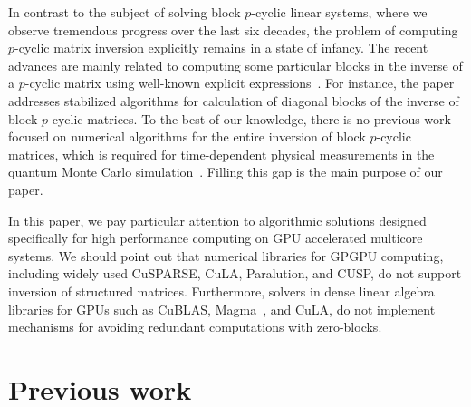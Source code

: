 \documentclass{llncs}
\newcommand{\Blas}{{\sc BLAS}\xspace}
\newcommand{\CuBlas}{{\sc Cu\Blas}\xspace}
\newcommand{\CuSparse}{{\sc CuSPARSE}\xspace}
\newcommand{\Magma}{{\sc Magma}\xspace}
\newcommand{\Cula}{{\sc CuLA}\xspace}
\newcommand{\Paralution}{{\sc Paralution}\xspace}
\newcommand{\Cusp}{{\sc CUSP}\xspace}
\begin{document}
In contrast to the subject of solving block $p$-cyclic linear systems, 
where we observe tremendous progress over the last six decades,
the problem of computing $p$-cyclic matrix inversion explicitly remains in 
a state of infancy. The recent advances are mainly related to 
computing some particular blocks in the inverse of a $p$-cyclic matrix
using well-known explicit expressions~\cite{Bai09,Tomas12}.
For instance, the paper~\cite{Tomas12} addresses stabilized algorithms for 
calculation of diagonal blocks of the inverse of block $p$-cyclic matrices. 
To the best of our knowledge, there is no previous work 
focused on numerical algorithms for the entire inversion of 
block $p$-cyclic matrices, which is required for 
time-dependent physical measurements in the quantum Monte Carlo 
simulation~\cite{Bai09}.
Filling this gap is the main purpose of our paper. 

In this paper, we pay particular attention to 
algorithmic solutions designed specifically for high performance computing 
on GPU accelerated multicore systems.
We should point out that numerical libraries for GPGPU computing,
including widely used 
\CuSparse, %
\Cula, %
\Paralution, %
and \Cusp, %
do not support inversion of structured %
matrices.
Furthermore, solvers in dense linear algebra libraries for GPUs 
such as \CuBlas, %
\Magma~\cite{Tomov10Magma}, %
and \Cula, %
do not implement mechanisms for avoiding redundant 
computations with zero-blocks.

\section{Previous work} 
\label{sec:background}
\end{document}
